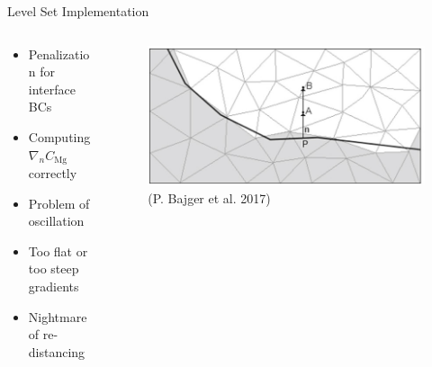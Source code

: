 \documentclass[11pt,t]{beamer}
\begin{document}
\begin{frame}[fragile]{Level Set Implementation}

	\begin{columns}[t]
		\begin{column}{.5\textwidth}
		\begin{itemize}
	\item	
Penalization for interface BCs
\item
Computing  $\nabla_{n} C_\mathrm{Mg}$ correctly
\item
Problem of oscillation
		\item
		Too flat or too steep gradients
		\item 
		Nightmare of re-distancing 
		\end{itemize}
		\end{column}
		\begin{column}{.5\textwidth}
			\vspace{-0.1cm}
			\begin{figure}
			\centering
			\includegraphics[width=\textwidth]{bajger}
			 \footnotesize (P. Bajger et al. 2017)
			\end{figure}
		\end{column}
	\end{columns}

\end{frame}
\end{document}
